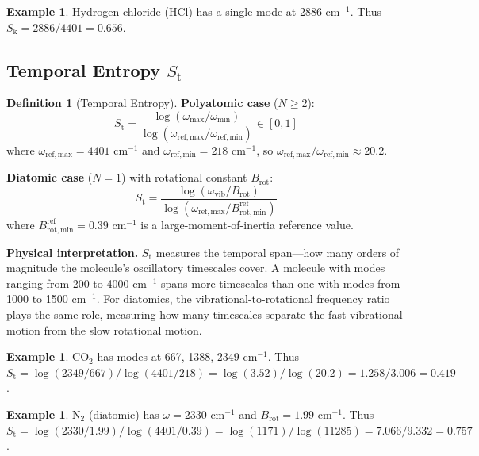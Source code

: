 \documentclass[11pt,twocolumn,a4paper]{article}
\theoremstyle{definition}
\newtheorem{definition}[theorem]{Definition}
\newtheorem{example}[theorem]{Example}
\theoremstyle{remark}
\newcommand{\Sk}{S_{\mathrm{k}}}
\newcommand{\St}{S_{\mathrm{t}}}
\newcommand{\Brot}{B_{\mathrm{rot}}}
\begin{document}
\begin{example}
Hydrogen chloride (HCl) has a single mode at 2886 cm$^{-1}$. Thus $\Sk = 2886/4401 = 0.656$.
\end{example}

\subsection{Temporal Entropy \texorpdfstring{$\St$}{S\_t}}

\begin{definition}[Temporal Entropy]
\label{def:s_t}
\textbf{Polyatomic case} ($N \geq 2$):
\begin{equation}
\St = \frac{\log(\omega_{\max}/\omega_{\min})}{\log(\omega_{\mathrm{ref,max}}/\omega_{\mathrm{ref,min}})} \in [0, 1]
\label{eq:s_t_poly}
\end{equation}
where $\omega_{\mathrm{ref,max}} = 4401$ cm$^{-1}$ and $\omega_{\mathrm{ref,min}} = 218$ cm$^{-1}$, so $\omega_{\mathrm{ref,max}}/\omega_{\mathrm{ref,min}} \approx 20.2$.

\textbf{Diatomic case} ($N = 1$) with rotational constant $\Brot$:
\begin{equation}
\St = \frac{\log(\omega_{\mathrm{vib}}/\Brot)}{\log(\omega_{\mathrm{ref,max}}/B_{\mathrm{rot,min}}^{\mathrm{ref}})}
\label{eq:s_t_diatomic}
\end{equation}
where $B_{\mathrm{rot,min}}^{\mathrm{ref}} = 0.39$ cm$^{-1}$ is a large-moment-of-inertia reference value.
\end{definition}

\textbf{Physical interpretation.} $\St$ measures the temporal span---how many orders of magnitude the molecule's oscillatory timescales cover. A molecule with modes ranging from 200 to 4000 cm$^{-1}$ spans more timescales than one with modes from 1000 to 1500 cm$^{-1}$. For diatomics, the vibrational-to-rotational frequency ratio plays the same role, measuring how many timescales separate the fast vibrational motion from the slow rotational motion.

\begin{example}
CO$_2$ has modes at 667, 1388, 2349 cm$^{-1}$. Thus $\St = \log(2349/667)/\log(4401/218) = \log(3.52)/\log(20.2) = 1.258/3.006 = 0.419$.
\end{example}

\begin{example}
N$_2$ (diatomic) has $\omega = 2330$ cm$^{-1}$ and $\Brot = 1.99$ cm$^{-1}$. Thus $\St = \log(2330/1.99)/\log(4401/0.39) = \log(1171)/\log(11285) = 7.066/9.332 = 0.757$.
\end{example}
\end{document}
